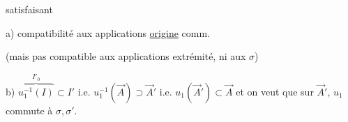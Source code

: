 satisfaisant

a) compatibilité aux applications \uline{origine}
comm.

(mais pas compatible aux applications extrémité, ni aux $\sigma$)

b) $\overbrace{u_1^{-1}(I)}^{I'_0}\subset I'$ i.e. $u_1^{-1}(\vec A)\supset\vec A'$ i.e. $u_1(\vec A')\subset\vec A$
et on veut que sur $\vec A'$, $u_1$ commute à $\sigma,\sigma'$.


